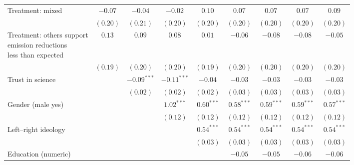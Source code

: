 \begin{table}[h]
\begin{center}
\begin{tabular}{l c c c c c c c c}
Treatment: mixed                                                                & $-0.07$      & $-0.04$       & $-0.02$       & $0.10$        & $0.07$        & $0.07$        & $0.07$        & $0.09$        \\
                                                                                & $(0.20)$     & $(0.21)$      & $(0.20)$      & $(0.20)$      & $(0.20)$      & $(0.20)$      & $(0.20)$      & $(0.20)$      \\
\shortstack{Treatment: others support\\emission reductions\\less than expected} & $0.13$       & $0.09$        & $0.08$        & $0.01$        & $-0.06$       & $-0.08$       & $-0.08$       & $-0.05$       \\
                                                                                & $(0.19)$     & $(0.20)$      & $(0.20)$      & $(0.19)$      & $(0.20)$      & $(0.20)$      & $(0.20)$      & $(0.20)$      \\
Trust in science                                                                &              & $-0.09^{***}$ & $-0.11^{***}$ & $-0.04$       & $-0.03$       & $-0.03$       & $-0.03$       & $-0.03$       \\
                                                                                &              & $(0.02)$      & $(0.02)$      & $(0.02)$      & $(0.03)$      & $(0.03)$      & $(0.03)$      & $(0.03)$      \\
Gender (male yes)                                                               &              &               & $1.02^{***}$  & $0.60^{***}$  & $0.58^{***}$  & $0.59^{***}$  & $0.59^{***}$  & $0.57^{***}$  \\
                                                                                &              &               & $(0.12)$      & $(0.12)$      & $(0.12)$      & $(0.12)$      & $(0.12)$      & $(0.12)$      \\
Left–right ideology                                                             &              &               &               & $0.54^{***}$  & $0.54^{***}$  & $0.54^{***}$  & $0.54^{***}$  & $0.54^{***}$  \\
                                                                                &              &               &               & $(0.03)$      & $(0.03)$      & $(0.03)$      & $(0.03)$      & $(0.03)$      \\
Education (numeric)                                                             &              &               &               &               & $-0.05$       & $-0.05$       & $-0.06$       & $-0.06$       \\

\end{tabular}
\end{center}
\end{table}

